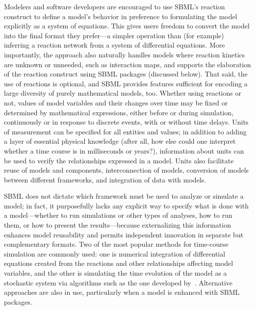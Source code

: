 \documentclass{sbml-paper}
\begin{document}
Modelers and software developers are encouraged to use SBML's reaction construct to define a model's behavior in preference to formulating the model explicitly as a system of equations.  This gives users freedom to convert the model into the final format they prefer---a simpler operation than (for example) inferring a reaction network from a system of differential equations.  More importantly, the approach also naturally handles models where reaction kinetics are unknown or unneeded, such as interaction maps, and supports the elaboration of the reaction construct using SBML packages (discussed below).  That said, the use of reactions is optional, and SBML provides features sufficient for encoding a large diversity of purely mathematical models, too.  Whether using reactions or not, values of model variables and their changes over time may be fixed or determined by mathematical expressions, either before or during simulation, continuously or in response to discrete events, with or without time delays.  Units of measurement can be specified for all entities and values; in addition to adding a layer of essential physical knowledge (after all, how else could one interpret whether a time course is in milliseconds or years?), information about units can be used to verify the relationships expressed in a model.  Units also facilitate reuse of models and components, interconnection of models, conversion of models between different frameworks, and integration of data with models.

SBML does not dictate which framework must be used to analyze or simulate a model; in fact, it purposefully lacks any explicit way to specify what is done with a model---whether to run simulations or other types of analyses, how to run them, or how to present the results---because externalizing this information enhances model reusability and permits independent innovation in separate but complementary formats.  Two of the most popular methods for time-course simulation are commonly used: one is numerical integration of differential equations created from the reactions and other relationships affecting model variables, and the other is simulating the time evolution of the model as a stochastic system via algorithms such as the one developed by~\cite{gillespie1977exact}.  Alternative approaches are also in use, particularly when a model is enhanced with SBML packages.
\end{document}
